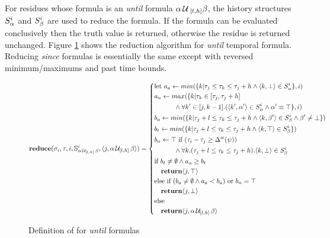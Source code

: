 For residues whose formula is an \emph{until} formula $\alpha \until_{[l,h]} \beta$, the history structures $\histst[\alpha]{i}$ and $\histst[\beta]{i}$ are used to reduce the formula.
If the formula can be evaluated conclusively then the truth value is returned, otherwise the residue is returned unchanged.
Figure \ref{fig:until} shows the reduction algorithm for \emph{until} temporal formula. Reducing \emph{since} formulas is essentially the same except with reversed minimum/maximums and past time bounds.

\begin{figure}
\small
\begin{align*}
\mathbf{reduce}(\sigma_i,\tau, i,\mathbb{S}^i_{\alpha\, \mathcal{U}_{[l,h]}\, \beta} ,\rp{j}{\alpha\, \mathcal{U}_{[l,h]}\, \beta}) = \left\{
\begin{aligned}
&\text{let } a_a \leftarrow min(\{k | \tau_j \leq \tau_k \leq \tau_j+h  \wedge \rp{k}{\bot} \in S^i_\alpha \},i) \\
& a_u \leftarrow max(\{k| \tau_k \in [\tau_j,\tau_j+h] \\
& \quad \quad \quad \wedge \forall k' \in [j,k-1].(\rp{k'}{\alpha'} \in S^i_\alpha \wedge \alpha' \equiv \top\},i) \\
& b_a \leftarrow min(\{k | \tau_j+l \leq \tau_k \leq \tau_j+h \wedge \rp{k}{\beta'} \in S^i_\beta \wedge \beta' \neq \bot\}) \\
&b_t \leftarrow min(\{k | \tau_j+l \leq \tau_k \leq \tau_j+h \wedge \rp{k}{\top} \in S^i_{\beta} \}) \\
&b_n \leftarrow \top \text{ if } (\tau_i - \tau_j \geq \wdelay(\psi)) \\
& \quad \quad \quad \wedge \forall k.(\tau_j+l \leq \tau_k \leq \tau_j+h). \rp{k}{\bot} \in S^i_{\beta} \\
&\text{if } b_t \neq \emptyset \wedge a_u \geq b_t \\
& \quad\mathbf{return} \rp{j}{\top} \\
&\text{else if } (b_a \neq \emptyset \wedge a_a < b_a) \text{ or } b_n = \top\\ & \quad\mathbf{return} \rp{j}{\bot} \\
&\text{else} \\
& \quad\mathbf{return} \rp{j}{\alpha\, \mathcal{U}_{[l,h]}\, \beta}
\end{aligned} \right. \\
\end{align*}
\caption{Definition of \reduce for \emph{until} formulas \label{fig:until}}
\end{figure}

